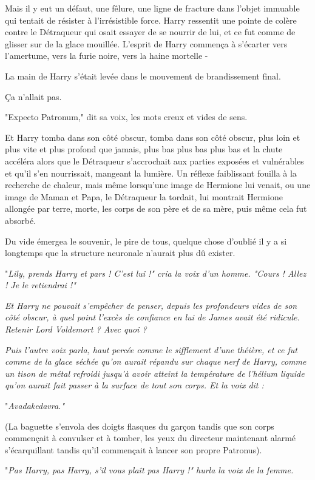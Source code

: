 Mais il y eut un défaut, une fêlure, une ligne de fracture dans l'objet immuable qui tentait de résister à l'irrésistible force. Harry ressentit une pointe de colère contre le Détraqueur qui osait essayer de se nourrir de lui, et ce fut comme de glisser sur de la glace mouillée. L'esprit de Harry commença à s'écarter vers l'amertume, vers la furie noire, vers la haine mortelle -

La main de Harry s'était levée dans le mouvement de brandissement final.

Ça n'allait pas.

"Expecto Patronum," dit sa voix, les mots creux et vides de sens.

Et Harry tomba dans son côté obscur, tomba dans son côté obscur, plus loin et plus vite et plus profond que jamais, plus bas plus bas plus bas et la chute accéléra alors que le Détraqueur s'accrochait aux parties exposées et vulnérables et qu'il s'en nourrissait, mangeant la lumière. Un réflexe faiblissant fouilla à la recherche de chaleur, mais même lorsqu'une image de Hermione lui venait, ou une image de Maman et Papa, le Détraqueur la tordait, lui montrait Hermione allongée par terre, morte, les corps de son père et de sa mère, puis même cela fut absorbé.

Du vide émergea le souvenir, le pire de tous, quelque chose d'oublié il y a si longtemps que la structure neuronale n'aurait plus dû exister.

"\emph{Lily, prends Harry et pars ! C'est lui !" cria la voix d'un homme. "Cours ! Allez ! Je le retiendrai !"} 

\emph{Et Harry ne pouvait s'empêcher de penser, depuis les profondeurs vides de son côté obscur, à quel point l'excès de confiance en lui de James avait été ridicule. Retenir Lord Voldemort ? Avec quoi ?} 

\emph{Puis l'autre voix parla, haut percée comme le sifflement d'une théière, et ce fut comme de la glace séchée qu'on aurait répandu sur chaque nerf de Harry, comme un tison de métal refroidi jusqu'à avoir atteint la température de l'hélium liquide qu'on aurait fait passer à la surface de tout son corps. Et la voix dit :} 

"\emph{Avadakedavra."} 

(La baguette s'envola des doigts flasques du garçon tandis que son corps commençait à convulser et à tomber, les yeux du directeur maintenant alarmé s'écarquillant tandis qu'il commençait à lancer son propre Patronus).

"\emph{Pas Harry, pas Harry, s'il vous plaît pas Harry !" hurla la voix de la femme.} 

